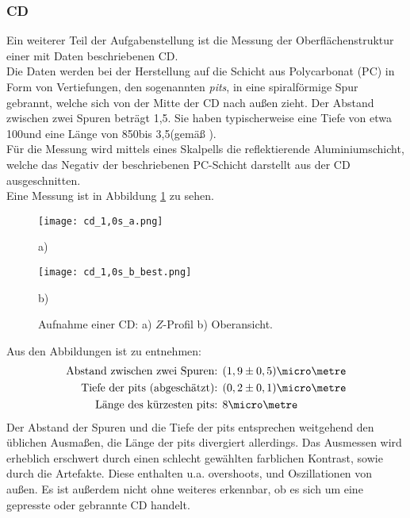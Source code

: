 \subsubsection{CD}
Ein weiterer Teil der Aufgabenstellung ist die Messung der Oberflächenstruktur einer mit Daten beschriebenen CD.\\
Die Daten werden bei der Herstellung auf die Schicht aus Polycarbonat (PC) in Form von Vertiefungen, den sogenannten \emph{pits}, in eine spiralförmige Spur gebrannt, welche sich von der Mitte der CD nach außen zieht. Der Abstand zwischen zwei Spuren beträgt 1,5\micro\metre . Sie haben typischerweise eine Tiefe von etwa 100\nano\metre und eine Länge von 850\nano\metre bis 3,5\micro\metre (gemäß \cite{lit:wiki_cd}).\\
Für die Messung wird mittels eines Skalpells die reflektierende Aluminiumschicht, welche das Negativ der beschriebenen PC-Schicht darstellt aus der CD ausgeschnitten.\\
Eine Messung ist in Abbildung \ref{fig:CD} zu sehen.
\begin{figure}[h]
\centering
	\begin{minipage}{0.45\textwidth}
	\centering
		\texttt{[image: cd\_1,0s\_a.png]}
		\caption*{a)}
	\end{minipage}
	\hfill
	\begin{minipage}{0.45\textwidth}
	\centering
		\texttt{[image: cd\_1,0s\_b\_best.png]}
		\caption*{b)}
	\end{minipage}
	\caption[Aufnahme einer CD]{Aufnahme einer CD: a) $Z$-Profil b) Oberansicht.}
	\label{fig:CD}
\end{figure}
Aus den Abbildungen ist zu entnehmen:
\begin{align*}
\text{Abstand zwischen zwei Spuren: }& (1,9\pm0,5)\micro\metre\\
\text{Tiefe der pits (abgeschätzt): }& (0,2\pm0,1)\micro\metre\\
\text{Länge des kürzesten pits: }& 8\micro\metre 
\end{align*}
Der Abstand der Spuren und die Tiefe der pits entsprechen weitgehend den üblichen Ausmaßen, die Länge der pits divergiert allerdings. Das Ausmessen wird erheblich erschwert durch einen schlecht gewählten farblichen Kontrast, sowie durch die Artefakte. Diese enthalten u.a. overshoots, und Oszillationen von außen. Es ist außerdem nicht ohne weiteres erkennbar, ob es sich um eine gepresste oder gebrannte CD handelt.
